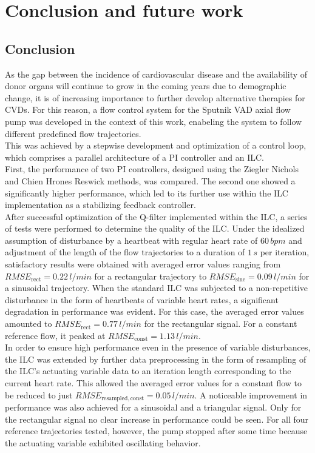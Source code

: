 \chapter{Conclusion and future work}
\section{Conclusion}
As the gap between the incidence of cardiovascular disease and the availability of donor organs will continue to grow in the coming years due to demographic change, it is of increasing importance to further develop alternative therapies for CVDs.
For this reason, a flow control system for the Sputnik VAD axial flow pump was developed in the context of this work, enabeling the system to follow different predefined flow trajectories.
\\This was achieved by a stepwise development and optimization of a control loop, which comprises a parallel architecture of a PI controller and an ILC.
\\First, the performance of two PI controllers, designed using the Ziegler Nichols and Chien Hrones Reswick methods, was compared. The second one showed a significantly higher performance, which led to its further use within the ILC implementation as a stabilizing feedback controller.
\\After successful optimization of the Q-filter implemented within the ILC, a series of tests were performed to determine the quality of the ILC. Under the idealized assumption of disturbance by a heartbeat with regular heart rate of $60\, bpm$ and adjustment of the length of the flow trajectories to a duration of $1\,s$ per iteration, satisfactory results were obtained with averaged error values ranging from $RMSE_{\mathrm{rect}}=0.22\,l/min$ for a rectangular trajectory to $RMSE_{\mathrm{sine}}=0.09\,l/min$ for a sinusoidal trajectory. When the standard ILC was subjected to a non-repetitive disturbance in the form of heartbeats of variable heart rates, a significant degradation in performance was evident. For this case, the averaged error values amounted to $RMSE_{\mathrm{rect}}=0.77\,l/min$ for the rectangular signal. For a constant reference flow, it peaked at $RMSE_{\mathrm{const}}=1.13\, l/min$.
\\In order to ensure high performance even in the presence of variable disturbances, the ILC was extended by further data preprocessing in the form of resampling of the ILC's actuating variable data to an iteration length corresponding to the current heart rate. This allowed the averaged error values for a constant flow to be reduced to just $RMSE_{\mathrm{resampled,const}}=0.05\, l/min$. A noticeable improvement in performance was also achieved for a sinusoidal and a triangular signal. Only for the rectangular signal no clear increase in performance could be seen.
For all four reference trajectories tested, however, the pump stopped after some time because the actuating variable exhibited oscillating behavior.

